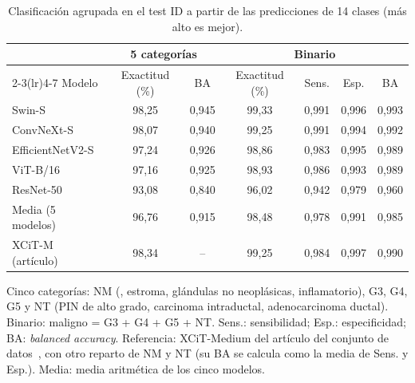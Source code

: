 \begin{table}
\centering
\footnotesize
\setlength{\tabcolsep}{4pt}
\caption{Clasificación agrupada en el test ID a partir de las predicciones de 14 clases (más alto es mejor).}
\label{tab:agrupaciones}
\begin{tabular*}{\linewidth}{@{\extracolsep{\fill}}lcccccc}
\toprule
& \multicolumn{2}{c}{5 categorías} & \multicolumn{4}{c}{Binario} \\
\cmidrule(lr){2-3}\cmidrule(lr){4-7}
Modelo & Exactitud (\%) & BA & Exactitud (\%) & Sens. & Esp. & BA \\
\midrule
Swin-S & 98{,}25 & 0{,}945 & 99{,}33 & 0{,}991 & 0{,}996 & 0{,}993 \\
ConvNeXt-S & 98{,}07 & 0{,}940 & 99{,}25 & 0{,}991 & 0{,}994 & 0{,}992 \\
EfficientNetV2-S & 97{,}24 & 0{,}926 & 98{,}86 & 0{,}983 & 0{,}995 & 0{,}989 \\
ViT-B/16 & 97{,}16 & 0{,}925 & 98{,}93 & 0{,}986 & 0{,}993 & 0{,}989 \\
ResNet-50 & 93{,}08 & 0{,}840 & 96{,}02 & 0{,}942 & 0{,}979 & 0{,}960 \\
\midrule
Media (5 modelos) & 96{,}76 & 0{,}915 & 98{,}48 & 0{,}978 & 0{,}991 & 0{,}985 \\
\midrule
XCiT-M (artículo) & 98{,}34 & -- & 99{,}25 & 0{,}984 & 0{,}997 & 0{,}990 \\
\bottomrule
\end{tabular*}

\smallskip
\parbox{\linewidth}{\scriptsize Cinco categorías: NM (, estroma, glándulas no neoplásicas, inflamatorio), G3, G4, G5 y NT (PIN de alto grado, carcinoma intraductal, adenocarcinoma ductal). Binario: maligno = G3 + G4 + G5 + NT. Sens.: sensibilidad; Esp.: especificidad; BA: \emph{balanced accuracy}. Referencia: XCiT-Medium del artículo del conjunto de datos~\cite{ayensa2026}, con otro reparto de NM y NT (su BA se calcula como la media de Sens. y Esp.). Media: media aritmética de los cinco modelos.}
\end{table}

